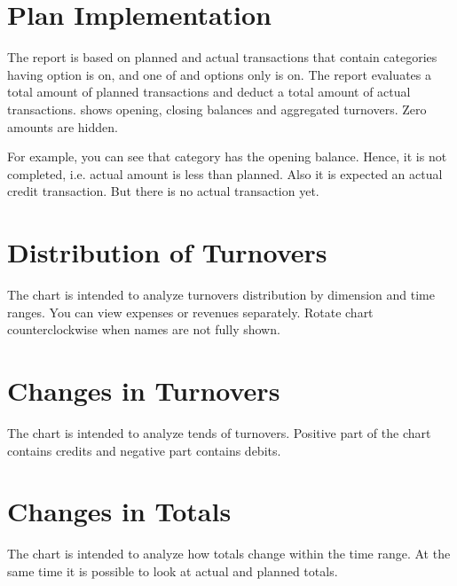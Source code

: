 \documentclass[a4paper,10pt,english]{sphinxmanual}
\begin{document}
\section{Plan Implementation}
\label{\detokenize{reports:plan-implementation}}
The report is based on planned and actual transactions that contain categories having
 option is on, and one of 
and  options only is on. The report evaluates a total
amount of planned transactions and deduct a total amount of actual transactions.
 shows opening,
closing balances and aggregated turnovers. Zero amounts are hidden.

For example, you can see that  category has the opening balance.
Hence, it is not completed, i.e. actual amount is less than planned.
Also it is expected an actual credit transaction. But there is no
actual transaction yet.

\noindent{}
\noindent{}
\noindent{}


\section{Distribution of Turnovers}
\label{\detokenize{reports:distribution-of-turnovers}}
The chart is intended to analyze turnovers distribution by dimension and time ranges. You can view
expenses or revenues separately. Rotate chart counterclockwise when names are not fully shown.


\section{Changes in Turnovers}
\label{\detokenize{reports:changes-in-turnovers}}
The chart is intended to analyze tends of turnovers. Positive part of the chart contains
credits and negative part contains debits.


\section{Changes in Totals}
\label{\detokenize{reports:changes-in-totals}}
The chart is intended to analyze how totals change within the time range. At the same time
it is possible to look at actual and planned totals.
\end{document}

